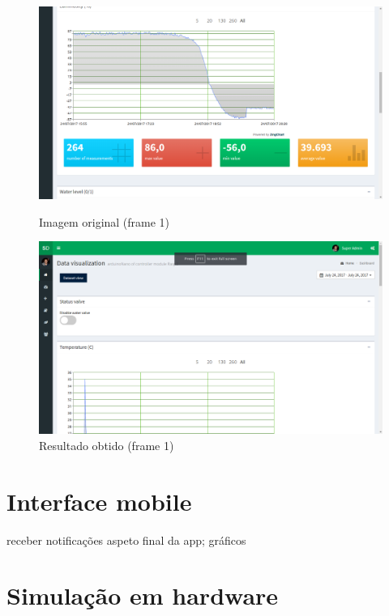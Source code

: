 \begin{figure}[h]
	\centering
	\begin{minipage}[b]{0.49\textwidth}
		\centering
		\includegraphics[width=\textwidth]{1.png}
		\caption{Imagem original (frame 1)}
		\label{bluetth05-res}
	\end{minipage}
	\hfill
	\begin{minipage}[b]{0.49\textwidth}
		\centering
		\includegraphics[width=\textwidth]{2.png}
		\caption{Resultado obtido (frame 1)}
		\label{comimageesquema}
	\end{minipage}
\end{figure}


	
\section{Interface mobile}


receber notificações 
aspeto final da app; gráficos 


\section{Simulação em hardware}


